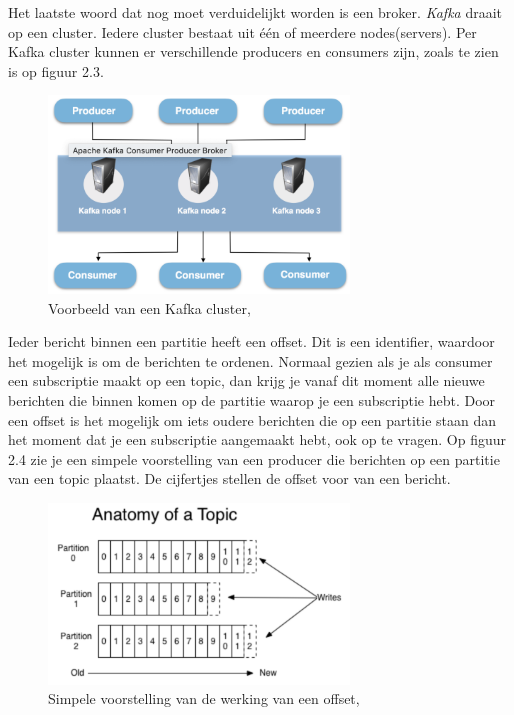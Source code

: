 Het laatste woord dat nog moet verduidelijkt worden is een broker. \emph{Kafka} draait op een cluster. Iedere cluster bestaat uit één of meerdere nodes(servers). Per Kafka cluster kunnen er verschillende producers en consumers zijn, zoals te zien is op figuur 2.3. 

\begin{figure}[h!]
    \centering
    \includegraphics[width=80mm]{../kafkaCluster.png}
    \caption{Voorbeeld van een Kafka cluster, \autocite{Johansson2016}}
    
\end{figure}


 Ieder bericht binnen een partitie heeft een offset. Dit is een identifier, waardoor het mogelijk is om de berichten te ordenen. Normaal gezien als je als consumer een subscriptie maakt op een topic, dan krijg je vanaf dit moment alle nieuwe berichten die binnen komen op de partitie waarop je een subscriptie hebt. Door een offset is het mogelijk om iets oudere berichten die op een partitie staan dan het moment dat je een subscriptie aangemaakt hebt, ook op te vragen. Op figuur 2.4 zie je een simpele voorstelling van een producer die berichten op een partitie van een topic plaatst. De cijfertjes stellen de offset voor van een bericht.
 \begin{figure}[h!]
     \centering
     \includegraphics[width=80mm]{../kafkaOffset.png}
     \caption{Simpele voorstelling van de werking van een offset, \autocite{Sookocheff2015}}
     
 \end{figure}


